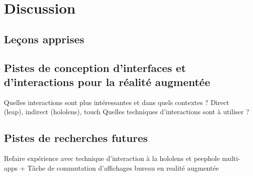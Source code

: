 \chapter{Discussion}
\label{ch:discussion}

\section{Leçons apprises}


\section{Pistes de conception d'interfaces et d'interactions pour la réalité augmentée}
Quelles interactions sont plus intéressantes et dans quels contextes ? Direct (leap), indirect (hololens), touch
Quelles techniques d'interactions sont à utiliser ?


\section{Pistes de recherches futures}
Refaire expérience avec technique d'interaction à la hololens et peephole
multi-apps + Tâche de commutation d'affichages
bureau en realité augmentée